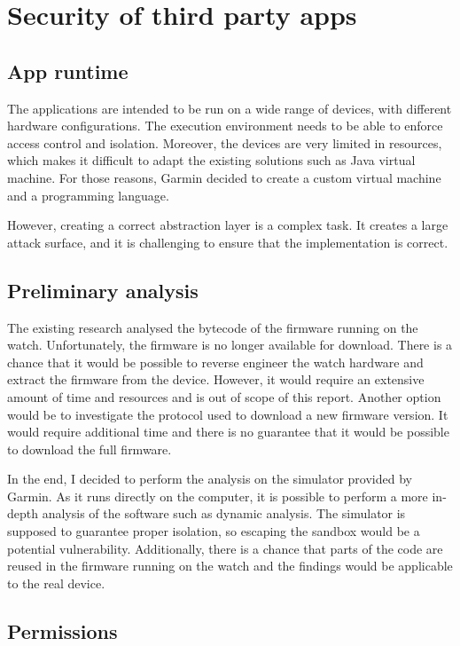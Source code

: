 
\chapter{Security of third party apps}

\section{App runtime}

The applications are intended to be run on a wide range of devices, with different hardware configurations.
The execution environment needs to be able to enforce access control and isolation.
Moreover, the devices are very limited in resources, which makes it difficult to adapt the existing solutions such as Java virtual machine.
For those reasons, Garmin decided to create a custom virtual machine and a programming language.

However, creating a correct abstraction layer is a complex task.
It creates a large attack surface, and it is challenging to ensure that the implementation is correct.

\section{Preliminary analysis}
The existing research analysed the bytecode of the firmware running on the watch.
Unfortunately, the firmware is no longer available for download.
There is a chance that it would be possible to reverse engineer the watch hardware and extract the firmware from the device.
However, it would require an extensive amount of time and resources and is out of scope of this report.
Another option would be to investigate the protocol used to download a new firmware version.
It would require additional time and there is no guarantee that it would be possible to download the full firmware.

In the end, I decided to perform the analysis on the simulator provided by Garmin.
As it runs directly on the computer, it is possible to perform a more in-depth analysis of the software such as dynamic analysis.
The simulator is supposed to guarantee proper isolation, so escaping the sandbox would be a potential vulnerability.
Additionally, there is a chance that parts of the code are reused in the firmware running on the watch and the findings would be applicable to the real device.

\section{Permissions}

